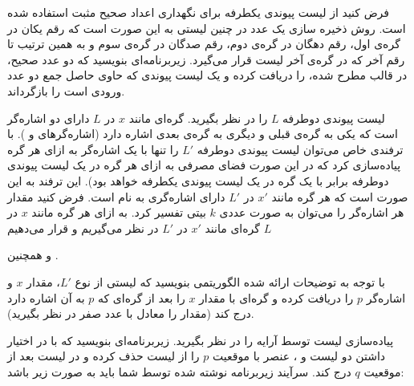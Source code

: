  فرض کنید از لیست پیوندی یکطرفه برای نگهداری اعداد صحیح مثبت استفاده شده است. روش ذخیره سازی یک عدد در چنین لیستی به این صورت است که رقم یکان در گره‌ی اول، رقم دهگان در گره‌ی دوم، رقم صدگان در گره‌ی سوم و به همین ترتیب تا رقم آخر که در گره‌ی آخر لیست قرار می‌گیرد. زیربرنامه‌ای بنویسید که دو عدد صحیح، در قالب مطرح شده، را دریافت کرده و یک لیست پیوندی که حاوی حاصل جمع دو عدد ورودی است را بازگرداند.


 لیست پیوندی دوطرفه {$L$} را در نظر بگیرید. گره‌ای مانند {$x$} در {$L$} دارای دو اشاره‌گر است که یکی به گره‌ی قبلی و دیگری به گره‌ی بعدی اشاره دارد (اشاره‌گرهای {} و {}). با ترفندی خاص می‌توان لیست پیوندی دوطرفه {$L'$} را تنها با یک اشاره‌گر به ازای هر گره پیاده‌سازی کرد که در این صورت فضای مصرفی به ازای هر گره در یک لیست پیوندی دوطرفه برابر با یک گره در یک لیست پیوندی یکطرفه خواهد بود). این ترفند به این صورت است که هر گره مانند {$x'$} در {$L'$} دارای اشاره‌گری به نام {} است. فرض کنید مقدار هر اشاره‌گر را می‌توان به صورت عددی {$k$} بیتی تفسیر کرد. به ازای هر گره مانند {$x$} در {$L$} گره‌ای مانند {$x'$} در {$L'$} در نظر می‌گیریم و قرار می‌دهیم { و همچنین 
{}.

با توجه به توضیحات ارائه شده الگوریتمی بنویسید که لیستی از نوع {$L'$}، مقدار {$x$} و اشاره‌گر {$p$} را دریافت کرده و گره‌ای با مقدار {$x$} را بعد از گره‌ای که {$p$} به آن اشاره دارد درج کند (مقدار {} را معادل با عدد صفر در نظر بگیرید).


 پیاده‌سازی لیست توسط آرایه را در نظر بگیرید. زیربرنامه‌ای بنویسید که با در اختیار داشتن دو لیست {} و {}، عنصر با موقعیت {$p$} را از لیست {} حذف کرده و در لیست {} بعد از موقعیت {$q$} درج کند. سرآیند زیربرنامه نوشته شده  توسط شما باید به صورت زیر باشد:
\begin{latin}
\begin{algorithmic}[1]
\Statex	{}
\end{algorithmic}
\end{latin}


}
